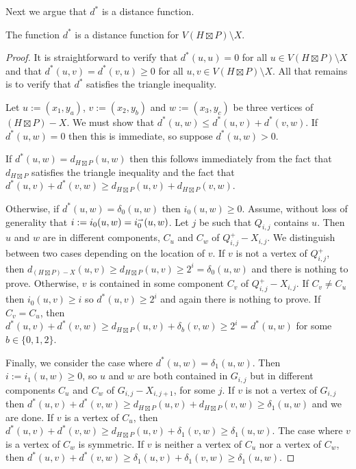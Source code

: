 \documentclass{patmorin}
\renewcommand{\ge}{\geqslant}
\renewcommand{\le}{\leqslant}
\begin{document}
Next we argue that $d^*$ is a distance function.

\begin{lem}\label{d_star_metric}
  The function $d^*$ is a distance function for $V(H\boxtimes P)\setminus X$.
\end{lem}

\begin{proof}
  It is straightforward to verify that $d^*(u,u)=0$ for all $u\in V(H\boxtimes P)\setminus X$ and that $d^*(u,v)=d^*(v,u)\ge 0$ for all $u,v\in V(H\boxtimes P)\setminus X$.  All that remains is to verify that $d^*$ satisfies the triangle inequality.

  Let $u:=(x_1,y_a)$, $v:=(x_2,y_b)$ and $w:=(x_3,y_c)$ be three vertices of $(H\boxtimes P)- X$.
  We must show that $d^*(u,w)\le d^*(u,v)+d^*(v,w)$.  If $d^*(u,w)=0$ then this is immediate, so suppose $d^*(u,w)>0$.

  If $d^*(u,w)=d_{H\boxtimes P}(u,w)$ then this follows immediately from the fact that $d_{H\boxtimes P}$ satisfies the triangle inequality and the fact that $d^*(u,v) + d^*(v,w)\ge d_{H\boxtimes P}(u,v)+d_{H\boxtimes P}(v,w)$.

  Otherwise, if $d^*(u,w)=\delta_0(u,w)$ then
  $i_0(u,w)\ge 0$. Assume, without loss of generality that $i:=i_0(u,w)=i_0^{\shortrightarrow}(u,w)$.  Let $j$ be such that $Q_{i,j}$ contains $u$.  Then $u$ and $w$ are in different components, $C_u$ and $C_w$ of $Q^+_{i,j}-X_{i,j}$.  We distinguish between two cases depending on the location of $v$.  If $v$ is not a vertex of $Q^+_{i,j}$, then $d_{(H\boxtimes P)-X}(u,v) \ge d_{H\boxtimes P}(u,v) \ge 2^i=\delta_0(u,w)$ and there is nothing to prove.  Otherwise, $v$ is contained in some component $C_v$ of $Q^+_{i,j}-X_{i,j}$.  If $C_v\neq C_u$ then $i_0(u,v)\ge i$ so $d^*(u,v)\ge 2^i$ and again there is nothing to prove.  If $C_v=C_u$, then $d^*(u,v)+d^*(v,w)\ge d_{H\boxtimes P}(u,v)+\delta_b(v,w)\ge 2^i=d^*(u,w)$ for some $b\in\{0,1,2\}$.

  Finally, we consider the case where $d^*(u,w)=\delta_1(u,w)$. Then $i:=i_1(u,w)\ge 0$, so $u$ and $w$ are both contained in $G_{i,j}$ but in different components $C_u$ and $C_w$ of $G_{i,j}-X_{i,j+1}$, for some $j$.  If $v$ is not a vertex of $G_{i,j}$ then $d^*(u,v)+d^*(v,w)\ge d_{H\boxtimes P}(u,v)+d_{H\boxtimes P}(v,w) \ge \delta_1(u,w)$ and we are done.  If $v$ is a vertex of $C_u$, then $d^*(u,v)+d^*(v,w)\ge d_{H\boxtimes P}(u,v)+\delta_1(v,w)\ge \delta_1(u,w)$. The case where $v$ is a vertex of $C_w$ is symmetric.  If $v$ is neither a vertex of $C_u$ nor a vertex of $C_w$, then $d^*(u,v)+d^*(v,w)\ge \delta_1(u,v) + \delta_1(v,w) \ge \delta_1(u,w)$.
\end{proof}
\end{document}
